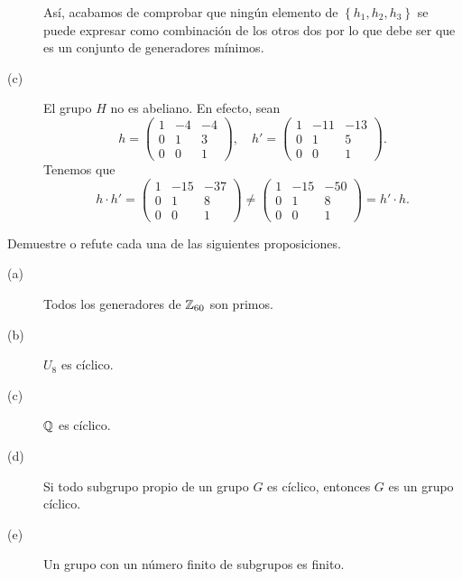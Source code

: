 \documentclass{article}
\begin{document}
\begin{sol}
\begin{description}
Así, acabamos de comprobar que ningún elemento de $\displaystyle \left\{ h_{1}, h_{2}, h_{3}\right\}  $ se puede expresar como combinación de los otros dos por lo que debe ser que es un conjunto de generadores mínimos.
\item[(c)] El grupo $\displaystyle H $ no es abeliano. En efecto, sean 
	\[h = \begin{pmatrix} 1 & -4 & -4 \\ 0 & 1 & 3 \\ 0 & 0 & 1 \end{pmatrix}, \quad h' = \begin{pmatrix} 1 & -11 & -13 \\ 0 & 1 & 5 \\ 0 & 0 & 1 \end{pmatrix} .\]
	Tenemos que 
	\[h \cdot h' = \begin{pmatrix} 1 & -15 & -37 \\ 0 & 1 & 8 \\ 0 & 0 & 1 \end{pmatrix} \neq \begin{pmatrix} 1 & -15 & -50 \\ 0 & 1 & 8 \\ 0 & 0 & 1 \end{pmatrix} = h' \cdot h .\]
\end{description}
\end{sol}

\begin{ej}
Demuestre o refute cada una de las siguientes proposiciones.
\begin{description}
\item[(a)] Todos los generadores de $\displaystyle \mathbb{Z}_{60} $ son primos.
\item[(b)] $\displaystyle U_{8} $ es cíclico.
\item[(c)] $\displaystyle \mathbb{Q} $ es cíclico.
\item[(d)] Si todo subgrupo propio de un grupo $\displaystyle G $ es cíclico, entonces $\displaystyle G $ es un grupo cíclico.
\item[(e)] Un grupo con un número finito de subgrupos es finito.
\end{description}
\end{ej}
\end{document}
